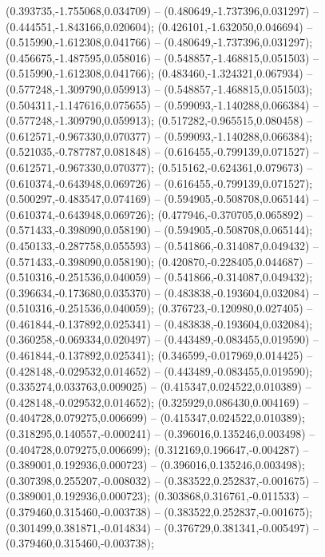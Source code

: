  (0.393735,-1.755068,0.034709) -- (0.480649,-1.737396,0.031297) -- (0.444551,-1.843166,0.020604);
 (0.426101,-1.632050,0.046694) -- (0.515990,-1.612308,0.041766) -- (0.480649,-1.737396,0.031297);
 (0.456675,-1.487595,0.058016) -- (0.548857,-1.468815,0.051503) -- (0.515990,-1.612308,0.041766);
 (0.483460,-1.324321,0.067934) -- (0.577248,-1.309790,0.059913) -- (0.548857,-1.468815,0.051503);
 (0.504311,-1.147616,0.075655) -- (0.599093,-1.140288,0.066384) -- (0.577248,-1.309790,0.059913);
 (0.517282,-0.965515,0.080458) -- (0.612571,-0.967330,0.070377) -- (0.599093,-1.140288,0.066384);
 (0.521035,-0.787787,0.081848) -- (0.616455,-0.799139,0.071527) -- (0.612571,-0.967330,0.070377);
 (0.515162,-0.624361,0.079673) -- (0.610374,-0.643948,0.069726) -- (0.616455,-0.799139,0.071527);
 (0.500297,-0.483547,0.074169) -- (0.594905,-0.508708,0.065144) -- (0.610374,-0.643948,0.069726);
 (0.477946,-0.370705,0.065892) -- (0.571433,-0.398090,0.058190) -- (0.594905,-0.508708,0.065144);
 (0.450133,-0.287758,0.055593) -- (0.541866,-0.314087,0.049432) -- (0.571433,-0.398090,0.058190);
 (0.420870,-0.228405,0.044687) -- (0.510316,-0.251536,0.040059) -- (0.541866,-0.314087,0.049432);
 (0.396634,-0.173680,0.035370) -- (0.483838,-0.193604,0.032084) -- (0.510316,-0.251536,0.040059);
 (0.376723,-0.120980,0.027405) -- (0.461844,-0.137892,0.025341) -- (0.483838,-0.193604,0.032084);
 (0.360258,-0.069334,0.020497) -- (0.443489,-0.083455,0.019590) -- (0.461844,-0.137892,0.025341);
 (0.346599,-0.017969,0.014425) -- (0.428148,-0.029532,0.014652) -- (0.443489,-0.083455,0.019590);
 (0.335274,0.033763,0.009025) -- (0.415347,0.024522,0.010389) -- (0.428148,-0.029532,0.014652);
 (0.325929,0.086430,0.004169) -- (0.404728,0.079275,0.006699) -- (0.415347,0.024522,0.010389);
 (0.318295,0.140557,-0.000241) -- (0.396016,0.135246,0.003498) -- (0.404728,0.079275,0.006699);
 (0.312169,0.196647,-0.004287) -- (0.389001,0.192936,0.000723) -- (0.396016,0.135246,0.003498);
 (0.307398,0.255207,-0.008032) -- (0.383522,0.252837,-0.001675) -- (0.389001,0.192936,0.000723);
 (0.303868,0.316761,-0.011533) -- (0.379460,0.315460,-0.003738) -- (0.383522,0.252837,-0.001675);
 (0.301499,0.381871,-0.014834) -- (0.376729,0.381341,-0.005497) -- (0.379460,0.315460,-0.003738);
